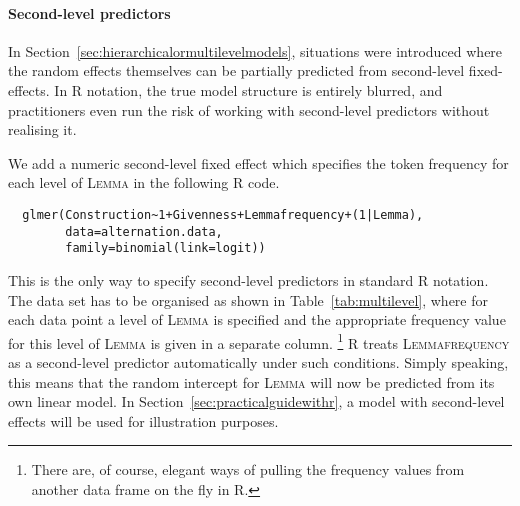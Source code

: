 \paragraph{Second-level predictors}

In Section~\ref{sec:hierarchicalormultilevelmodels}, situations were introduced where the random effects themselves can be partially predicted from second-level fixed-effects.
In R notation, the true model structure is entirely blurred, and practitioners even run the risk of working with second-level predictors without realising it.

We add a numeric second-level fixed effect which specifies the token frequency for each level of \textsc{Lemma} in the following R code.

\begin{lstlisting}
  glmer(Construction~1+Givenness+Lemmafrequency+(1|Lemma),
        data=alternation.data,
        family=binomial(link=logit))
\end{lstlisting}

This is the only way to specify second-level predictors in standard R notation.
The data set has to be organised as shown in Table~\ref{tab:multilevel}, where for each data point a level of \textsc{Lemma} is specified and the appropriate frequency value for this level of \textsc{Lemma} is given in a separate column.%
\footnote{There are, of course, elegant ways of pulling the frequency values from another data frame on the fly in R.}
R treats \textsc{Lemmafrequency} as a second-level predictor automatically under such conditions.
Simply speaking, this means that the random intercept for \textsc{Lemma} will now be predicted from its own linear model.
In Section~\ref{sec:practicalguidewithr}, a model with second-level effects will be used for illustration purposes.


